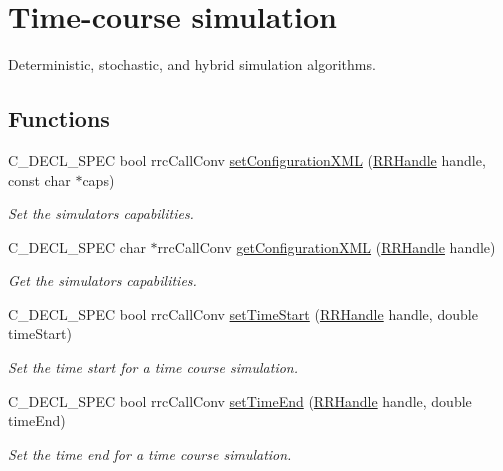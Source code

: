 \hypertarget{group__simulation}{}\section{Time-\/course simulation}
\label{group__simulation}


Deterministic, stochastic, and hybrid simulation algorithms.  


\subsection*{Functions}
\begin{DoxyCompactItemize}
\item 
C\+\_\+\+D\+E\+C\+L\+\_\+\+S\+P\+E\+C bool rrc\+Call\+Conv \hyperlink{group__simulation_ga704215830b7d1b353cbd990c04a766c2}{set\+Configuration\+X\+M\+L} (\hyperlink{rrc__types_8h_a1d68f0592372208fa5a5f2799ea4b3ae}{R\+R\+Handle} handle, const char $\ast$caps)
\begin{DoxyCompactList}\small\item\em Set the simulator\textquotesingle{}s capabilities. \end{DoxyCompactList}\item 
C\+\_\+\+D\+E\+C\+L\+\_\+\+S\+P\+E\+C char $\ast$rrc\+Call\+Conv \hyperlink{group__simulation_ga40f63e6f1505d91ecf40bed49d8d717e}{get\+Configuration\+X\+M\+L} (\hyperlink{rrc__types_8h_a1d68f0592372208fa5a5f2799ea4b3ae}{R\+R\+Handle} handle)
\begin{DoxyCompactList}\small\item\em Get the simulator\textquotesingle{}s capabilities. \end{DoxyCompactList}\item 
C\+\_\+\+D\+E\+C\+L\+\_\+\+S\+P\+E\+C bool rrc\+Call\+Conv \hyperlink{group__simulation_ga6f2c769375399d14087d6e5e99339aa7}{set\+Time\+Start} (\hyperlink{rrc__types_8h_a1d68f0592372208fa5a5f2799ea4b3ae}{R\+R\+Handle} handle, double time\+Start)
\begin{DoxyCompactList}\small\item\em Set the time start for a time course simulation. \end{DoxyCompactList}\item 
C\+\_\+\+D\+E\+C\+L\+\_\+\+S\+P\+E\+C bool rrc\+Call\+Conv \hyperlink{group__simulation_ga93f6c401b6a9e301fcdc380a6048b28c}{set\+Time\+End} (\hyperlink{rrc__types_8h_a1d68f0592372208fa5a5f2799ea4b3ae}{R\+R\+Handle} handle, double time\+End)
\begin{DoxyCompactList}\small\item\em Set the time end for a time course simulation. \end{DoxyCompactList}\item 

\end{DoxyCompactItemize}
